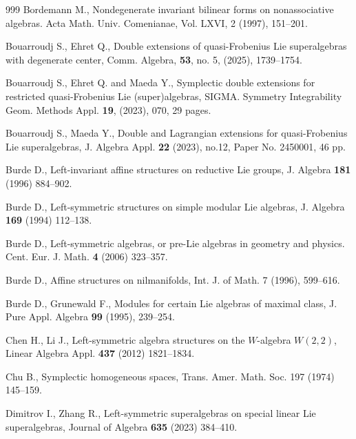 \documentclass[12pt]{amsart}
\begin{document}
\begin{thebibliography}{999}
 Bordemann M., Nondegenerate invariant bilinear forms on nonassociative algebras. Acta Math. Univ. Comenianae, Vol. LXVI, 2 (1997), 151--201.


 Bouarroudj S., Ehret Q., Double extensions of quasi-Frobenius Lie superalgebras with degenerate center, Comm.  Algebra, {\bf 53}, no. 5, (2025), 1739--1754.

Bouarroudj S., Ehret Q. and Maeda Y.,
Symplectic double extensions for restricted quasi-Frobenius Lie (super)algebras, SIGMA. Symmetry Integrability  Geom. Methods Appl. {\bf 19}, (2023), 070, 29 pages.

 Bouarroudj S., Maeda Y., Double and Lagrangian extensions for quasi-Frobenius Lie superalgebras, J. Algebra Appl. \textbf{22} (2023), no.12, Paper No. 2450001, 46 pp. 

 Burde D., Left-invariant affine structures on reductive Lie groups, J. Algebra {\bf 181} (1996) 884--902.

 Burde D., Left-symmetric structures on simple modular Lie algebras, J. Algebra {\bf 169} (1994) 112--138.

 Burde D., Left-symmetric algebras, or pre-Lie algebras in geometry and physics.
Cent. Eur. J. Math. {\bf 4} (2006) 323--357.

 Burde D., Affine structures on nilmanifolds, Int. J. of Math. 7 (1996), 599--616.

 Burde D., Grunewald F., Modules for certain Lie algebras of maximal class, J. Pure Appl. Algebra {\bf 99}
(1995), 239--254.

 Chen H., Li J., Left-symmetric algebra structures on the $W$-algebra $W(2, 2)$, Linear Algebra Appl. {\bf 437} (2012) 1821--1834.

 Chu B., Symplectic homogeneous spaces,  Trans. Amer. Math. Soc. 197 (1974) 145--159.

 Dimitrov I., Zhang R., Left-symmetric superalgebras on special linear Lie superalgebras, Journal of Algebra {\bf 635} (2023) 384--410.


\end{thebibliography}
\end{document}
